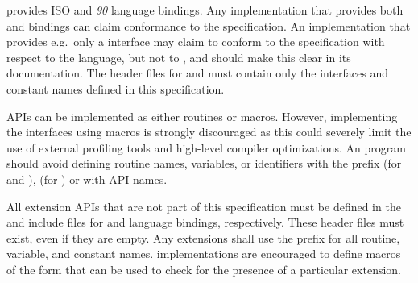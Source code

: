\openshmem provides ISO \Clang{} and \Fortran{} \textit{90} language bindings.
Any implementation that provides both \Clang{} and \Fortran{} bindings can claim
conformance to the specification. An implementation that provides e.g.\ only a
\Clang{} interface may claim to conform to the \openshmem specification with
respect to the \Clang{} language, but not to \Fortran, and should make this
clear in its documentation. The \openshmem header files for \Clang{} and
\Fortran{} must contain only the interfaces and constant names defined in this
specification.

\openshmem \ac{API}s can be implemented as either routines or macros. However,
implementing the interfaces using macros is strongly discouraged as this could
severely limit the use of external profiling tools and high-level compiler
optimizations. An \openshmem program should avoid defining routine names,
variables, or identifiers with the prefix \shmemprefix (for \Clang{} and
\Fortran), \shmemprefixC (for \Clang) or with \openshmem \ac{API} names.

All \openshmem extension \ac{API}s that are not part of this specification must
be defined in the  and  include files for
\Clang{} and \Fortran{} language bindings, respectively.  These header files
must exist, even if they are empty.  Any extensions shall use the
 prefix for all routine, variable, and constant names.
\openshmem implementations are encouraged to define macros of the form
 that can be used to check for the presence of
a particular extension.
